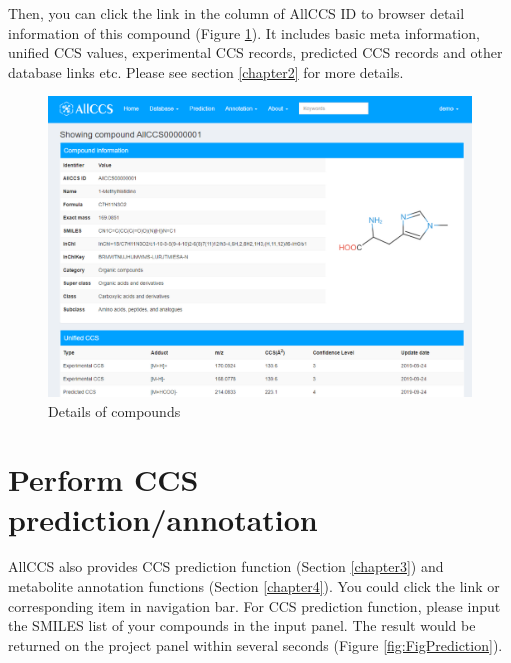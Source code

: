 \documentclass[12pt,]{book}
\theoremstyle{definition}
\theoremstyle{definition}
\theoremstyle{definition}
\theoremstyle{remark}
\begin{document}
Then, you can click the link in the column of AllCCS ID to browser
detail information of this compound (Figure \ref{fig:FigBrowser2}). It
includes basic meta information, unified CCS values, experimental CCS
records, predicted CCS records and other database links etc. Please see
section \ref{chapter2} for more details.

\begin{figure}

{\centering \includegraphics{images/chapter1/browser_2} 

}

\caption{Details of compounds}\label{fig:FigBrowser2}
\end{figure}

\section{Perform CCS prediction/annotation}\label{chaptere1d3}

AllCCS also provides CCS prediction function (Section \ref{chapter3})
and metabolite annotation functions (Section \ref{chapter4}). You could
click the link or corresponding item in navigation bar. For CCS
prediction function, please input the SMILES list of your compounds in
the input panel. The result would be returned on the project panel
within several seconds (Figure \ref{fig:FigPrediction}).
\end{document}
